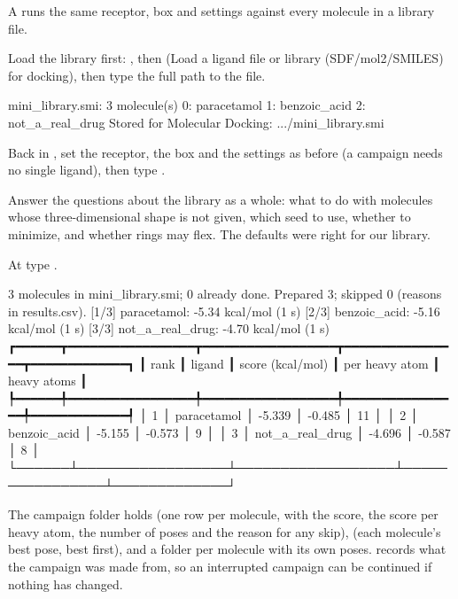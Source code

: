 A  runs the same receptor, box and settings against every
molecule in a library file.

\begin{steps}
  \item Load the library first: , then  (\textsf{Load a ligand
        file or library (SDF/mol2/SMILES) for docking}), then type the full
        path to the file.
\begin{screen}
  mini_library.smi: 3 molecule(s)
    0: paracetamol
    1: benzoic_acid
    2: not_a_real_drug
Stored for Molecular Docking: .../mini_library.smi
\end{screen}
  \item Back in , set the receptor, the box and the settings as before
        (a campaign needs no single ligand), then type .
  \item Answer the questions about the library as a whole: what to do with
        molecules whose three-dimensional shape is not given, which seed to
        use, whether to minimize, and whether rings may flex. The defaults
        were right for our library.
  \item At 
        type .
\end{steps}

\begin{screen}
  3 molecules in mini_library.smi; 0 already done.
  Prepared 3; skipped 0 (reasons in results.csv).
  [1/3] paracetamol: -5.34 kcal/mol (1 s)
  [2/3] benzoic_acid: -5.16 kcal/mol (1 s)
  [3/3] not_a_real_drug: -4.70 kcal/mol (1 s)
┏━━━━━━┳━━━━━━━━━━━━━━━━━┳━━━━━━━━━━━━━━━━━━┳━━━━━━━━━━━━━━━━┳━━━━━━━━━━━━━┓
┃ rank ┃ ligand          ┃ score (kcal/mol) ┃ per heavy atom ┃ heavy atoms ┃
┡━━━━━━╇━━━━━━━━━━━━━━━━━╇━━━━━━━━━━━━━━━━━━╇━━━━━━━━━━━━━━━━╇━━━━━━━━━━━━━┩
│ 1    │ paracetamol     │ -5.339           │ -0.485         │ 11          │
│ 2    │ benzoic_acid    │ -5.155           │ -0.573         │ 9           │
│ 3    │ not_a_real_drug │ -4.696           │ -0.587         │ 8           │
└──────┴─────────────────┴──────────────────┴────────────────┴─────────────┘
\end{screen}

The campaign folder holds  (one row per molecule, with the
score, the score per heavy atom, the number of poses and the reason for any
skip),  (each molecule's best pose, best first), and a
folder per molecule with its own poses.  records what the
campaign was made from, so an interrupted campaign can be continued if nothing
has changed.

